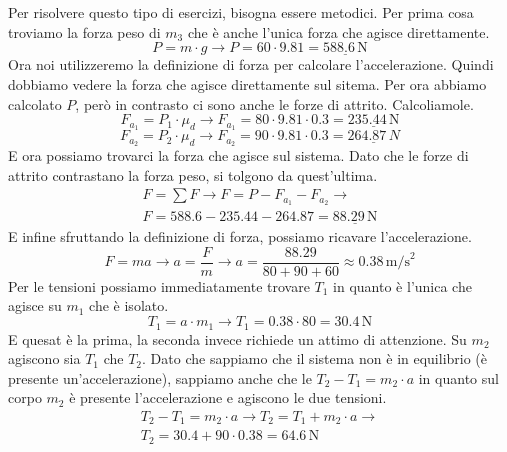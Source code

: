 Per risolvere questo tipo di esercizi, bisogna essere metodici. Per prima cosa troviamo la forza
peso di $m_3$ che è anche l'unica forza che agisce direttamente.
\begin{equation*}
P = m\cdot g \rightarrow P = 60\cdot9.81 = \underline{588.6\,\text{N}}
\end{equation*}
Ora noi utilizzeremo la definizione di forza per calcolare l'accelerazione. Quindi dobbiamo vedere
la forza che agisce direttamente sul sitema. Per ora abbiamo calcolato $P$, però in contrasto
ci sono anche le forze di attrito. Calcoliamole.
\begin{equation*}
F_{a_1} = P_1\cdot\mu_d \rightarrow F_{a_1} = 80\cdot9.81\cdot0.3 = \underline{235.44\,\text{N}}
\end{equation*}
\begin{equation*}
F_{a_2} = P_2\cdot\mu_d \rightarrow F_{a_2} = 90\cdot9.81\cdot0.3 = \underline{264.87\,N}
\end{equation*}
E ora possiamo trovarci la forza che agisce sul sistema. Dato che le forze di attrito contrastano
la forza peso, si tolgono da quest'ultima.
\begin{align*}
F = \sum F \rightarrow F = P - F_{a_1} - F_{a_2} \rightarrow\\
F = 588.6 - 235.44 - 264.87 = \underline{88.29\,\text{N}}
\end{align*}
E infine sfruttando la definizione di forza, possiamo ricavare l'accelerazione.
\begin{equation*}
F = ma \rightarrow a = \frac{F}{m} \rightarrow a = \frac{88.29}{80+90+60} 
\approx\boxed{0.38\,\text{m/s}^2}
\end{equation*}
Per le tensioni possiamo immediatamente trovare $T_1$ in quanto è l'unica che agisce su $m_1$ che è
isolato.
\begin{equation*}
T_1 = a\cdot m_1 \rightarrow T_1 = 0.38\cdot80 = \boxed{30.4\,\text{N}}
\end{equation*}
E quesat è la prima, la seconda invece richiede un attimo di attenzione. Su $m_2$ agiscono sia $T_1$ 
che $T_2$. Dato che sappiamo che il sistema non è in equilibrio (è presente un'accelerazione),
sappiamo anche che le $T_2-T_1 = m_2\cdot a$ in quanto sul corpo $m_2$ è presente l'accelerazione e
agiscono le due tensioni.
\begin{align*}
T_2-T_1 = m_2\cdot a \rightarrow T_2 = T_1 + m_2\cdot a \rightarrow\\
T_2 = 30.4 + 90\cdot0.38 = \boxed{64.6\,\text{N}}
\end{align*}

